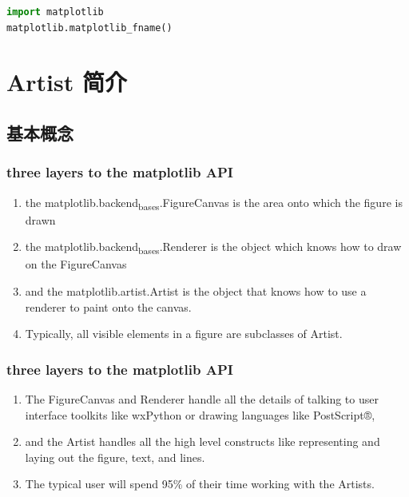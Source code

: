 \documentclass[UTF8,a4paper,12pt]{ctexart}  %
\providecommand{\tightlist}{\setlength{\itemsep}{0pt}\setlength{\parskip}{0pt}}
\begin{document}
\begin{lstlisting}[language=Python]
import matplotlib
matplotlib.matplotlib_fname()
\end{lstlisting}

\hypertarget{artist-ux7b80ux4ecb}{%
\section{Artist 简介}\label{artist-ux7b80ux4ecb}}

\hypertarget{ux57faux672cux6982ux5ff5-1}{%
\subsection{基本概念}\label{ux57faux672cux6982ux5ff5-1}}

\hypertarget{three-layers-to-the-matplotlib-api}{%
\subsubsection{three layers to the matplotlib API}\label{three-layers-to-the-matplotlib-api}}

\begin{enumerate}
\def\labelenumi{\arabic{enumi}.}
\tightlist
\item
  the matplotlib.backend\textsubscript{bases}.FigureCanvas is the area onto which
  the figure is drawn
\item
  the matplotlib.backend\textsubscript{bases}.Renderer is the object which knows how
  to draw on the FigureCanvas
\item
  and the matplotlib.artist.Artist is the object that knows how to use
  a renderer to paint onto the canvas.
\item
  Typically, all visible elements in a figure are subclasses of
  Artist.
\end{enumerate}

\hypertarget{three-layers-to-the-matplotlib-api-1}{%
\subsubsection{three layers to the matplotlib API}\label{three-layers-to-the-matplotlib-api-1}}

\begin{enumerate}
\def\labelenumi{\arabic{enumi}.}
\tightlist
\item
  The FigureCanvas and Renderer handle all the details of talking to
  user interface toolkits like wxPython or drawing languages like
  PostScript®,
\item
  and the Artist handles all the high level constructs like
  representing and laying out the figure, text, and lines.
\item
  The typical user will spend 95\% of their time working with the
  Artists.
\end{enumerate}
\end{document}
